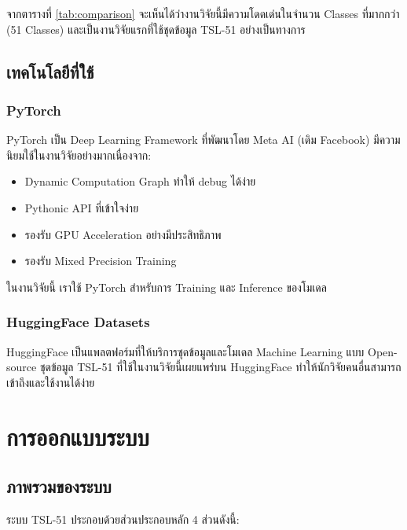 \documentclass[12pt,a4paper]{report}
\begin{document}
จากตารางที่ \ref{tab:comparison} จะเห็นได้ว่างานวิจัยนี้มีความโดดเด่นในจำนวน Classes ที่มากกว่า (51 Classes)
และเป็นงานวิจัยแรกที่ใช้ชุดข้อมูล TSL-51 อย่างเป็นทางการ

\section{เทคโนโลยีที่ใช้}

\subsection{PyTorch}

PyTorch เป็น Deep Learning Framework ที่พัฒนาโดย Meta AI (เดิม Facebook) 
มีความนิยมใช้ในงานวิจัยอย่างมากเนื่องจาก:
\begin{itemize}
    \item Dynamic Computation Graph ทำให้ debug ได้ง่าย
    \item Pythonic API ที่เข้าใจง่าย
    \item รองรับ GPU Acceleration อย่างมีประสิทธิภาพ
    \item รองรับ Mixed Precision Training
\end{itemize}

ในงานวิจัยนี้ เราใช้ PyTorch สำหรับการ Training และ Inference ของโมเดล

\subsection{HuggingFace Datasets}

HuggingFace เป็นแพลตฟอร์มที่ให้บริการชุดข้อมูลและโมเดล Machine Learning 
แบบ Open-source ชุดข้อมูล TSL-51 ที่ใช้ในงานวิจัยนี้เผยแพร่บน HuggingFace 
ทำให้นักวิจัยคนอื่นสามารถเข้าถึงและใช้งานได้ง่าย

\clearpage

\chapter{การออกแบบระบบ}

\section{ภาพรวมของระบบ}

ระบบ TSL-51 ประกอบด้วยส่วนประกอบหลัก 4 ส่วนดังนี้:
\end{document}
